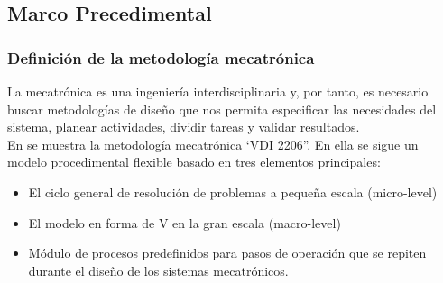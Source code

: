 \subsection{Marco Precedimental}

\subsubsection{Definici\'on de la metodolog\'ia mecatr\'onica}

La mecatrónica es una ingeniería interdisciplinaria y, por tanto, es necesario buscar 
metodologías de diseño que nos permita especificar las necesidades del sistema, planear actividades, dividir tareas y validar resultados.
\\
En \cite{Geusemeir2002} se muestra la metodología mecatrónica ‘VDI 2206”. En ella se sigue un modelo 
procedimental flexible basado en tres elementos principales:
\begin{itemize}
    \item El ciclo general de resolución de problemas a pequeña escala (micro-level)
    \item El modelo en forma de V en la gran escala (macro-level)
    \item Módulo de procesos predefinidos para pasos de operación que se repiten durante el diseño de los sistemas mecatrónicos.
\end{itemize}

